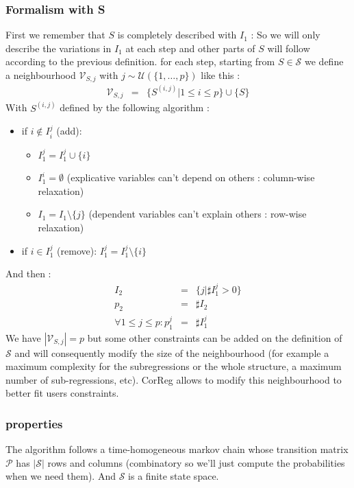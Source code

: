 \documentclass[11pt,a4paper]{article}
\begin{document}
		\subsubsection{Formalism with S}
	First we remember that $S$ is completely described with $I_1$ :
	So we will only describe the variations in $I_1$ at each step and other parts of $S$ will follow according to the previous definition.
	for each step, starting from $S \in \mathcal{S}$ we define a neighbourhood $\mathcal{V}_{S,j}$ with $j \sim \mathcal{U}(\{1,\dots,p\}) $ like this  :	
	\begin{eqnarray}
		\mathcal{V}_{S,j}&=&\{ S^{(i,j)} | 1\leq i\leq p \} \cup\{S \}
	\end{eqnarray}	
	With $S^{(i,j)}$ defined by the following algorithm :
	\begin{itemize}
		\item if $i \notin I_i^j$ (add): 
			\begin{itemize}
				\item $I_1^j=I_1^j\cup \{i\}$
				\item $I_1^i=\emptyset$ (explicative variables can't depend on others : column-wise relaxation)
				\item $I_1=I_1 \setminus \{j\}$ (dependent variables can't explain others : row-wise relaxation) 
			\end{itemize}			 
		\item if $i \in I_1^j$ (remove): $I_1^j=I_1^j\setminus \{i\}$
	\end{itemize}
	And then :
	\begin{eqnarray}
		I_2&=&\{j |\sharp I_1^j>0 \}\\
		p_2&=& \sharp I_2 \\
		\forall 1\leq j\leq p :  p_1^j&=&\sharp I_1^j
	\end{eqnarray}
	We have $|\mathcal{V}_{S,j}|=p$ but some other constraints can be added on the definition of $\mathcal{S}$ and will consequently modify the size of the neighbourhood (for example a maximum complexity for the subregressions or the whole structure, a maximum number of sub-regressions, etc). CorReg allows to modify this neighbourhood to better fit users constraints. 
	
	\subsubsection{properties}
	The algorithm follows a time-homogeneous markov chain whose transition matrix $\mathcal{P}$ has $|\mathcal{S}|$ rows and columns (combinatory so we'll just compute the probabilities when we need them).
	And $\mathcal{S}$ is a finite state space.%
	
\end{document}
